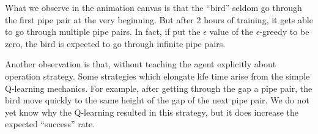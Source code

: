 \documentclass[conference,compsoc]{IEEEtran}
\begin{document}
What we observe in the animation canvas is that the ``bird'' seldom go through the first pipe pair at the very beginning. But after 2 hours of training, it gets able to go through multiple pipe pairs. In fact, if put the $\epsilon$ value of the $\epsilon$-greedy to be zero, the bird is expected to go through infinite pipe pairs. 

Another observation is that, without teaching the agent explicitly about operation strategy. Some strategies which elongate life time arise from the simple Q-learning mechanics. For example, after getting through the gap a pipe pair, the bird move quickly to the same height of the gap of the next pipe pair. We do not yet know why the Q-learning resulted in this strategy, but it does increase the expected ``success'' rate. 


%
%

\end{document}
